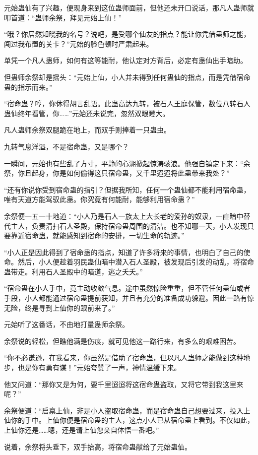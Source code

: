 \begin{this_body}
元始蛊仙有了兴趣，便现身来到这位蛊师面前，但他还未开口说话，那凡人蛊师就叩首道：“蛊师余祭，拜见元始上仙！”

“哦？你居然知晓我的名号？说吧，是受哪个仙友的指点？能让你凭借蛊师之能，闯过我布置的关卡？”元始的脸色顿时严肃起来。

单凭一个凡人蛊师，如何有这等能耐，他认定对方背后，必定有蛊仙出手暗助。

但蛊师余祭却是摇头：“元始上仙，小人并未得到任何蛊仙的指点，而是凭借宿命蛊的指示而来。”

“宿命蛊？哼，你休得胡言乱语。此蛊高达九转，被石人王庭保管，数位八转石人蛊仙终年看管，你……”元始还未说完，忽然双眼瞪大。

凡人蛊师余祭双腿跪在地上，而双手则捧着一只蛊虫。

九转气息洋溢，不是宿命蛊，又是哪个？

一瞬间，元始也有些乱了方寸，平静的心湖掀起惊涛骇浪。他强自镇定下来：“余祭，你且起身，你是如何偷得这只宿命蛊，又千里迢迢将此蛊带来我处？”

“还有你说你受到宿命蛊的指引？但据我所知，任何一个蛊仙都不能利用宿命蛊，唯有天道方能驾驭此蛊。你究竟有何能耐，能够利用宿命蛊？”

余祭便一五一十地道：“小人乃是石人一族太上大长老的爱孙的奴隶，一直暗中替代主人，负责清扫石人圣殿，保持宿命蛊周围的清洁。也不知哪一天，小人发现只要靠近宿命蛊，就能感知到宿命的安排，一切生命的轨迹。”

“小人正是因此得到了宿命蛊的指点，知道了许多将来的事情，也明白了自己的使命。然后，小人便趁着羽民蛊仙暗中潜入石人圣殿，被发现后引发的动乱，将宿命蛊带走。利用石人圣殿中的暗道，逃之夭夭。”

“宿命蛊在小人手中，竟主动收敛气息。途中虽然惊险重重，但不管任何蛊仙或者手段，小人都能通过宿命蛊提前获知，并且有充分的准备成功躲避。因此一路有惊无险，终是寻到上仙你的跟前来了。”

元始听了这番话，不由地打量蛊师余祭。

余祭说的轻松，但瞧他满是伤痕，就可见他这一路行来，有多么的艰难困苦。

“你不必谦逊，在我看来，你虽然是借助了宿命蛊，但以凡人蛊师之能做到这种地步，也是你有勇有谋！”元始夸赞了一声，神情温缓下来。

他又问道：“那你又是为何，要千里迢迢将这宿命蛊盗取，又将它带到我这里来呢？”

余祭便道：“启禀上仙，非是小人盗取宿命蛊，而是宿命蛊自己想要过来，投入上仙你的手中。上仙你便是宿命蛊的主人，这点小人已从宿命蛊上看到。不仅如此，上仙你还是……嗯，还是请上仙您亲自体悟一番吧。”

说着，余祭将头垂下，双手抬高，将宿命蛊献给了元始蛊仙。


\end{this_body}
